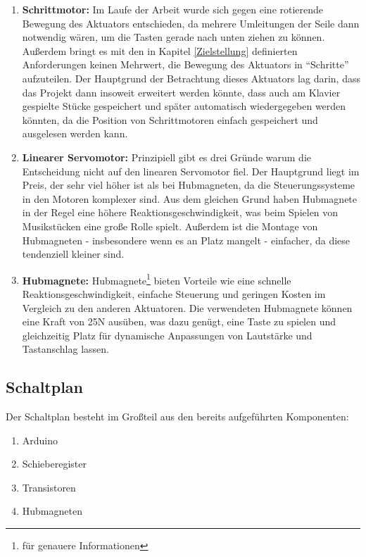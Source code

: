 \begin{enumerate}
	\item \textbf{Schrittmotor:} Im Laufe der Arbeit wurde sich gegen eine rotierende Bewegung des Aktuators entschieden, da mehrere Umleitungen der Seile dann notwendig wären, um die Tasten gerade nach unten ziehen zu können.
	Außerdem bringt es mit den in Kapitel \ref{Zielstellung} definierten Anforderungen keinen Mehrwert,
	die Bewegung des Aktuators in \enquote{Schritte} aufzuteilen. Der Hauptgrund der Betrachtung dieses Aktuators lag darin,
	dass das Projekt dann insoweit erweitert werden könnte, dass auch am Klavier
	gespielte Stücke gespeichert und später automatisch wiedergegeben werden könnten, da die Position von Schrittmotoren einfach gespeichert und ausgelesen werden kann.
	\item \textbf{Linearer Servomotor:} Prinzipiell gibt es drei Gründe warum die Entscheidung nicht auf den linearen Servomotor fiel.
	Der Hauptgrund liegt im Preis, der sehr viel höher ist als bei Hubmagneten, da die Steuerungssysteme in den Motoren komplexer sind.
	Aus dem gleichen Grund haben Hubmagnete in der Regel eine höhere Reaktionsgeschwindigkeit, was beim Spielen von Musikstücken eine große Rolle spielt.
	Außerdem ist die Montage von Hubmagneten - insbesondere wenn es an Platz mangelt - einfacher, da diese tendenziell kleiner sind.
	\item \textbf{Hubmagnete:} Hubmagnete\footnote{\cite*[siehe ][]{DatasheetSolenoids} für genauere Informationen} bieten Vorteile wie eine schnelle Reaktionsgeschwindigkeit, einfache Steuerung und geringen Kosten im Vergleich zu den anderen Aktuatoren. Die verwendeten Hubmagnete können eine Kraft von 25N ausüben,
	was dazu genügt, eine Taste  zu spielen und gleichzeitig Platz für dynamische Anpassungen von Lautstärke und Tastanschlag lassen.
\end{enumerate}

\subsection{Schaltplan} \label{subsec:schaltplan}

Der Schaltplan besteht im Großteil aus den bereits aufgeführten Komponenten:

\begin{enumerate}
	\item Arduino
	\item Schieberegister
	\item Transistoren
	\item Hubmagneten
\end{enumerate}


